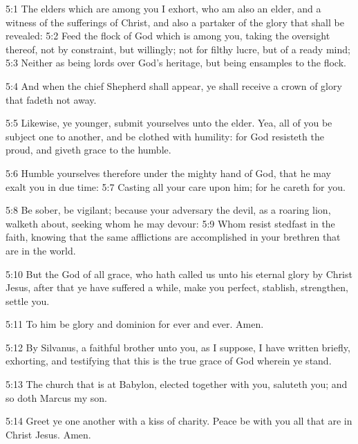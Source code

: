 5:1 The elders which are among you I exhort, who am also an elder, and a witness of the sufferings of Christ, and also a partaker of the glory that shall be revealed: 5:2 Feed the flock of God which is among you, taking the oversight thereof, not by constraint, but willingly; not for filthy lucre, but of a ready mind; 5:3 Neither as being lords over God's heritage, but being ensamples to the flock.

5:4 And when the chief Shepherd shall appear, ye shall receive a crown of glory that fadeth not away.

5:5 Likewise, ye younger, submit yourselves unto the elder. Yea, all of you be subject one to another, and be clothed with humility: for God resisteth the proud, and giveth grace to the humble.

5:6 Humble yourselves therefore under the mighty hand of God, that he may exalt you in due time: 5:7 Casting all your care upon him; for he careth for you.

5:8 Be sober, be vigilant; because your adversary the devil, as a roaring lion, walketh about, seeking whom he may devour: 5:9 Whom resist stedfast in the faith, knowing that the same afflictions are accomplished in your brethren that are in the world.

5:10 But the God of all grace, who hath called us unto his eternal glory by Christ Jesus, after that ye have suffered a while, make you perfect, stablish, strengthen, settle you.

5:11 To him be glory and dominion for ever and ever. Amen.

5:12 By Silvanus, a faithful brother unto you, as I suppose, I have written briefly, exhorting, and testifying that this is the true grace of God wherein ye stand.

5:13 The church that is at Babylon, elected together with you, saluteth you; and so doth Marcus my son.

5:14 Greet ye one another with a kiss of charity. Peace be with you all that are in Christ Jesus. Amen.

